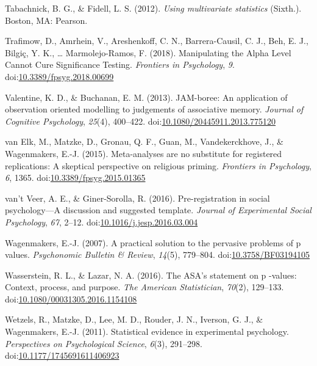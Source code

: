 \documentclass[,man, mask]{apa6}
\theoremstyle{definition}
\theoremstyle{definition}
\theoremstyle{definition}
\theoremstyle{remark}
\begin{document}
\hypertarget{ref-Tabachnick2012}{}
Tabachnick, B. G., \& Fidell, L. S. (2012). \emph{Using multivariate
statistics} (Sixth.). Boston, MA: Pearson.

\hypertarget{ref-Trafimow2018}{}
Trafimow, D., Amrhein, V., Areshenkoff, C. N., Barrera-Causil, C. J.,
Beh, E. J., Bilgiç, Y. K., \ldots{} Marmolejo-Ramos, F. (2018).
Manipulating the Alpha Level Cannot Cure Significance Testing.
\emph{Frontiers in Psychology}, \emph{9}.
doi:\href{https://doi.org/10.3389/fpsyg.2018.00699}{10.3389/fpsyg.2018.00699}

\hypertarget{ref-Valentine2013}{}
Valentine, K. D., \& Buchanan, E. M. (2013). JAM-boree: An application
of observation oriented modelling to judgements of associative memory.
\emph{Journal of Cognitive Psychology}, \emph{25}(4), 400--422.
doi:\href{https://doi.org/10.1080/20445911.2013.775120}{10.1080/20445911.2013.775120}

\hypertarget{ref-VanElk2015}{}
van Elk, M., Matzke, D., Gronau, Q. F., Guan, M., Vandekerckhove, J., \&
Wagenmakers, E.-J. (2015). Meta-analyses are no substitute for
registered replications: A skeptical perspective on religious priming.
\emph{Frontiers in Psychology}, \emph{6}, 1365.
doi:\href{https://doi.org/10.3389/fpsyg.2015.01365}{10.3389/fpsyg.2015.01365}

\hypertarget{ref-VantVeer2016}{}
van't Veer, A. E., \& Giner-Sorolla, R. (2016). Pre-registration in
social psychology---A discussion and suggested template. \emph{Journal
of Experimental Social Psychology}, \emph{67}, 2--12.
doi:\href{https://doi.org/10.1016/j.jesp.2016.03.004}{10.1016/j.jesp.2016.03.004}

\hypertarget{ref-Wagenmakers2007}{}
Wagenmakers, E.-J. (2007). A practical solution to the pervasive
problems of p values. \emph{Psychonomic Bulletin \& Review},
\emph{14}(5), 779--804.
doi:\href{https://doi.org/10.3758/BF03194105}{10.3758/BF03194105}

\hypertarget{ref-Wasserstein2016}{}
Wasserstein, R. L., \& Lazar, N. A. (2016). The ASA's statement on p
-values: Context, process, and purpose. \emph{The American
Statistician}, \emph{70}(2), 129--133.
doi:\href{https://doi.org/10.1080/00031305.2016.1154108}{10.1080/00031305.2016.1154108}

\hypertarget{ref-Wetzels2011}{}
Wetzels, R., Matzke, D., Lee, M. D., Rouder, J. N., Iverson, G. J., \&
Wagenmakers, E.-J. (2011). Statistical evidence in experimental
psychology. \emph{Perspectives on Psychological Science}, \emph{6}(3),
291--298.
doi:\href{https://doi.org/10.1177/1745691611406923}{10.1177/1745691611406923}
\end{document}

